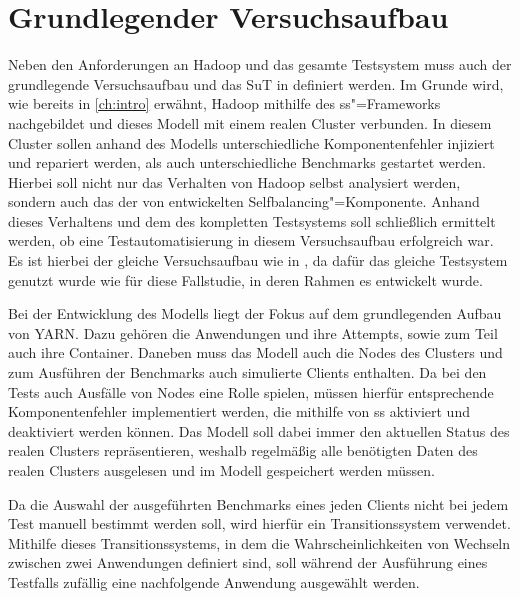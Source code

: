 \section{Grundlegender Versuchsaufbau}
\label{sec:clusterSetup}

Neben den Anforderungen an Hadoop und das gesamte Testsystem muss auch der grundlegende Versuchsaufbau und das \ac{SuT} in definiert werden.
Im Grunde wird, wie bereits in \cref{ch:intro} erwähnt, Hadoop mithilfe des \ac{ss}"=Frameworks nachgebildet und dieses Modell mit einem realen Cluster verbunden.
In diesem Cluster sollen anhand des Modells unterschiedliche Komponentenfehler injiziert und repariert werden, als auch unterschiedliche Benchmarks gestartet werden.
Hierbei soll nicht nur das Verhalten von Hadoop selbst analysiert werden, sondern auch das der von \citeauthor{Zhang2016} entwickelten Selfbalancing"=Komponente.
Anhand dieses Verhaltens und dem des kompletten Testsystems soll schließlich ermittelt werden, ob eine Testautomatisierung in diesem Versuchsaufbau erfolgreich war.
Es ist hierbei der gleiche Versuchsaufbau wie in \cite{Eberhardinger2018}, da dafür das gleiche Testsystem genutzt wurde wie für diese Fallstudie, in deren Rahmen es entwickelt wurde.

Bei der Entwicklung des Modells liegt der Fokus auf dem grundlegenden Aufbau von \ac{YARN}.
Dazu gehören die Anwendungen und ihre Attempts, sowie zum Teil auch ihre Container.
Daneben muss das Modell auch die Nodes des Clusters und zum Ausführen der Benchmarks auch simulierte Clients enthalten.
Da bei den Tests auch Ausfälle von Nodes eine Rolle spielen, müssen hierfür entsprechende Komponentenfehler implementiert werden, die mithilfe von \ac{ss} aktiviert und deaktiviert werden können.
Das Modell soll dabei immer den aktuellen Status des realen Clusters repräsentieren, weshalb regelmäßig alle benötigten Daten des realen Clusters ausgelesen und im Modell gespeichert werden müssen.

Da die Auswahl der ausgeführten Benchmarks eines jeden Clients nicht bei jedem Test manuell bestimmt werden soll, wird hierfür ein Transitionssystem verwendet.
Mithilfe dieses Transitionssystems, in dem die Wahrscheinlichkeiten von Wechseln zwischen zwei Anwendungen definiert sind, soll während der Ausführung eines Testfalls zufällig eine nachfolgende Anwendung ausgewählt werden.

